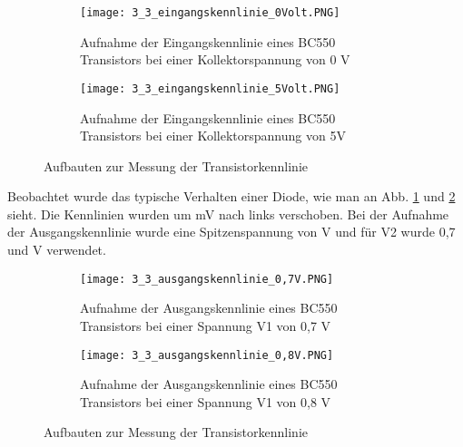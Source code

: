 \documentclass[12pt,a4paper]{article}
\begin{document}
\begin{figure}[H]
        \centering
        \begin{subfigure}[t]{0.48\textwidth}
               \texttt{[image: 3\_3\_eingangskennlinie\_0Volt.PNG]}
				\caption[Aufnahme der Eingangskennlinie eines BC550 Transistors bei einer Kollektorspannung von 0 V]{Aufnahme der Eingangskennlinie eines BC550 Transistors bei einer Kollektorspannung von 0 V}
 				 \label{fig:3.311}
        \end{subfigure}%
        \hfill
        \begin{subfigure}[t]{0.48\textwidth}
                \texttt{[image: 3\_3\_eingangskennlinie\_5Volt.PNG]}
  				\caption[Aufnahme der Eingangskennlinie eines BC550 Transistors bei einer Kollektorspannung von 5 V]{Aufnahme der Eingangskennlinie eines BC550 Transistors bei einer Kollektorspannung von 5V}
  				\label{fig:3.312}
        \end{subfigure}
        \caption{Aufbauten zur Messung der Transistorkennlinie}
        \label{fig:3.31_Auswertung}
\end{figure}
Beobachtet wurde das typische Verhalten einer Diode, wie man an Abb. \ref{fig:3.311} und \ref{fig:3.312} sieht. Die Kennlinien wurden um \unit[480]{mV} nach links verschoben.\newline
Bei der Aufnahme der Ausgangskennlinie wurde eine Spitzenspannung von \unit[1]{V} und für V2 wurde 0,7 und \unit[0,8]{V} verwendet. 
\begin{figure}[H]
        \centering
        \begin{subfigure}[t]{0.48\textwidth}
               \texttt{[image: 3\_3\_ausgangskennlinie\_0,7V.PNG]}
				\caption[Aufnahme der Ausgangskennlinie eines BC550 Transistors bei einer Spannung V1 von 0,7 V]{Aufnahme der Ausgangskennlinie eines BC550 Transistors bei einer Spannung V1 von 0,7 V}
 				 \label{fig:3.321}
        \end{subfigure}%
        \hfill
        \begin{subfigure}[t]{0.48\textwidth}
                \texttt{[image: 3\_3\_ausgangskennlinie\_0,8V.PNG]}
  				\caption[Aufnahme der Ausgangskennlinie eines BC550 Transistors bei einer Spannung V1 von 0,8 V]{Aufnahme der Ausgangskennlinie eines BC550 Transistors bei einer Spannung V1 von 0,8 V}
  				\label{fig:3.322}
        \end{subfigure}
        \caption{Aufbauten zur Messung der Transistorkennlinie}
        \label{fig:3.32_Auswertung}
\end{figure}
\end{document}
